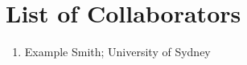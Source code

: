 \chapter{List of Collaborators}
\thispagestyle{empty}

\begin{enumerate}
\item Example Smith; University of Sydney
\end{enumerate}

